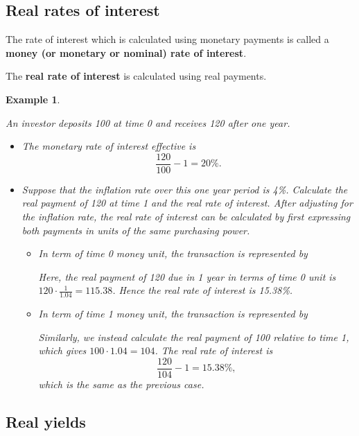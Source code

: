 \documentclass[landscape, 20pt]{extreport}
\theoremstyle{definition}
\theoremstyle{definition}
\newtheorem{example}{Example}[chapter]
\theoremstyle{definition}
\theoremstyle{definition}
\theoremstyle{remark}
\begin{document}
\hypertarget{real-rates-of-interest}{%
\subsection{Real rates of interest}\label{real-rates-of-interest}}

The rate of interest which is calculated using monetary payments is
called a \textbf{money (or monetary or nominal) rate of interest}.

The \textbf{real rate of interest} is calculated using real payments.

\newpage \begin{example}
\protect\hypertarget{exm:unlabeled-div-54}{}\label{exm:unlabeled-div-54}

\emph{An investor deposits 100 at time 0 and receives 120
after one year.}

\begin{itemize}
\item
  \emph{The monetary rate of interest effective is
  \[\frac{120}{100} - 1 = 20\%.\]}
\item
  \emph{Suppose that the inflation rate over this one year period is 4\%.
  Calculate the real payment of 120 at time 1 and the real rate of
  interest. After adjusting for the inflation rate, the real rate of
  interest can be calculated by first expressing both payments in
  units of the same purchasing power.}

  \begin{itemize}
  \item
    \emph{In term of time 0 money unit, the transaction is represented
    by}

    \emph{Here, the real payment of 120 due in 1 year in terms of time 0
    unit is \(\displaystyle{120 \cdot \frac{1}{1.04} = 115.38}\).
    Hence the real rate of interest is 15.38\%.}
  \item
    \emph{In term of time 1 money unit, the transaction is represented
    by}

    \emph{Similarly, we instead calculate the real payment of 100
    relative to time 1, which gives \(100 \cdot 1.04 = 104\). The real
    rate of interest is \[\frac{120}{104} - 1 = 15.38\%,\] which is
    the same as the previous case.}
  \end{itemize}
\end{itemize}

\end{example}

\hypertarget{real-yields}{%
\subsection{Real yields}\label{real-yields}}
\end{document}

